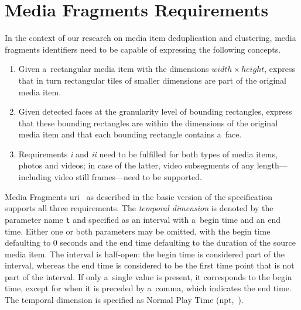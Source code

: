 \documentclass{article}
\begin{document}

\section{Media Fragments Requirements}
\label{sec:media-fragment-requirements}

In the context of our research on media item deduplication and clustering, media fragments identifiers need to be capable of expressing the following concepts.
\begin{enumerate}[i]
  \itemsep0em
  \item Given a~rectangular media item with the dimensions $ width \times height $, express that in turn rectangular tiles of smaller dimensions are part of the original media item.
  \item Given detected faces at the granularity level of bounding rectangles, express that these bounding rectangles are within the dimensions of the original media item and that each bounding rectangle contains a~face.
  \item Requirements \textit{i} and \textit{ii} need to be fulfilled for both types of media items, photos and videos; in case of the latter, video subsegments of any length---including video still frames---need to be supported.
\end{enumerate}

Media Fragments {\sc uri}~\cite{troncy2012mediafragments} as described in the basic version of the specification supports all three requirements. The \emph{temporal dimension} is denoted by the parameter name \texttt{t} and specified as an interval with a~begin time and an end time. Either one or both parameters may be omitted, with the begin time defaulting to 0 seconds and the end time defaulting to the duration of the source media item. The interval is half-open: the begin time is considered part of the interval, whereas the end time is considered to be the first time point that is not part of the interval.
If only a~single value is present, it corresponds to the begin time, except for when it is preceded by a~comma, which indicates the end time. The temporal dimension is specified as Normal Play Time ({\sc npt},~\cite{schulzrinne1998realtime}).
\end{document}
